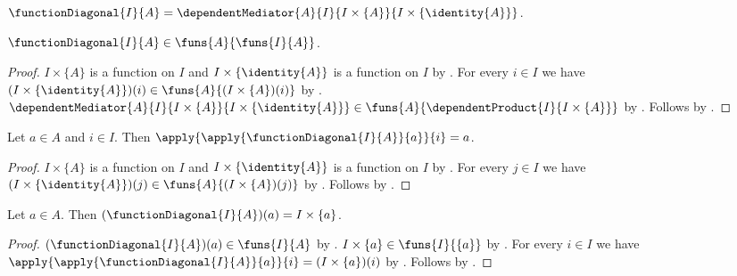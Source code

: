 \begin{definition}\label{function_diagonal}
    $\functionDiagonal{I}{A}
        =\dependentMediator{A}{I}{I\times\{A\}}{I\times\{\identity{A}\}}$.
\end{definition}

\begin{proposition}\label{function_diagonal_type}
    $\functionDiagonal{I}{A}\in\funs{A}{\funs{I}{A}}$.
\end{proposition}
\begin{proof}
    $I\times\{A\}$ is a function on $I$ and
        $I\times\{\identity{A}\}$ is a function on $I$ by
        .
    For every $i\in I$ we have
        $(I\times\{\identity{A}\})(i)\in\funs{A}{(I\times\{A\})(i)}$ by
        .
    $\dependentMediator{A}{I}{I\times\{A\}}{I\times\{\identity{A}\}}\in
        \funs{A}{\dependentProduct{I}{I\times\{A\}}}$ by
        .
    Follows by .
\end{proof}

\begin{proposition}\label{function_diagonal_coordinate}
    Let $a\in A$ and $i\in I$.
    Then $\apply{\apply{\functionDiagonal{I}{A}}{a}}{i}=a$.
\end{proposition}
\begin{proof}
    $I\times\{A\}$ is a function on $I$ and
        $I\times\{\identity{A}\}$ is a function on $I$ by
        .
    For every $j\in I$ we have
        $(I\times\{\identity{A}\})(j)\in\funs{A}{(I\times\{A\})(j)}$ by
        .
    Follows by .
\end{proof}

\begin{proposition}\label{function_diagonal_apply}
    Let $a\in A$.
    Then $(\functionDiagonal{I}{A})(a)=I\times\{a\}$.
\end{proposition}
\begin{proof}
    $(\functionDiagonal{I}{A})(a)\in\funs{I}{A}$ by
        .
    $I\times\{a\}\in\funs{I}{\{a\}}$ by .
    For every $i\in I$ we have
        $\apply{\apply{\functionDiagonal{I}{A}}{a}}{i}=(I\times\{a\})(i)$ by
        .
    Follows by .
\end{proof}

